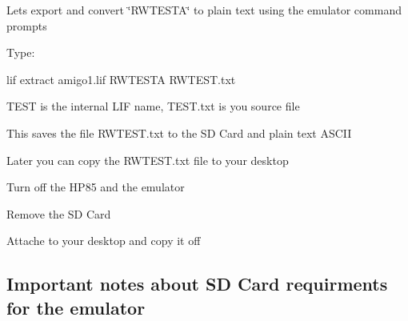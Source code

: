 \begin{DoxyItemize}
\item Lets export and convert \char`\"{}\+R\+W\+T\+E\+S\+T\+A\char`\"{} to plain text using the emulator command prompts
\begin{DoxyItemize}
\item Type\+:
\begin{DoxyItemize}
\item lif extract amigo1.\+lif R\+W\+T\+E\+S\+TA R\+W\+T\+E\+S\+T.\+txt
\begin{DoxyItemize}
\item T\+E\+ST is the internal L\+IF name, T\+E\+S\+T.\+txt is you source file
\end{DoxyItemize}
\item This saves the file R\+W\+T\+E\+S\+T.\+txt to the SD Card and plain text A\+S\+C\+II
\end{DoxyItemize}
\item Later you can copy the R\+W\+T\+E\+S\+T.\+txt file to your desktop
\begin{DoxyItemize}
\item Turn off the H\+P85 and the emulator
\item Remove the SD Card
\item Attache to your desktop and copy it off
\end{DoxyItemize}
\end{DoxyItemize}
\end{DoxyItemize}





\subsection*{Important notes about SD Card requirments for the emulator}


